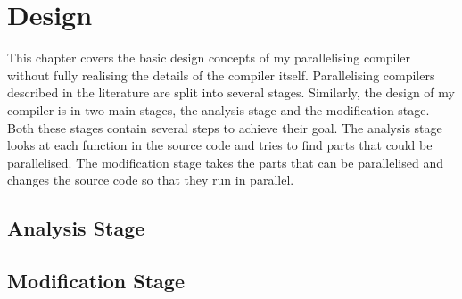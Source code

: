 \chapter{Design}
This chapter covers the basic design concepts of my parallelising compiler without fully realising the details of the compiler itself. Parallelising compilers described in the literature are split into several stages. Similarly, the design of my compiler is in two main stages, the analysis stage and the modification stage. Both these stages contain several steps to achieve their goal. The analysis stage looks at each function in the source code and tries to find parts that could be parallelised. The modification stage takes the parts that can be parallelised and changes the source code so that they run in parallel.

\section{Analysis Stage}



\section{Modification Stage}
